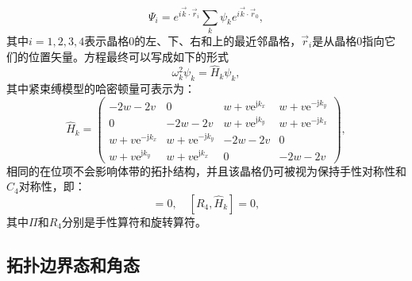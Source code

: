 \begin{equation}\label{eq4-6}
    \Psi_i = e^{i\vec{k} \cdot \vec{r}_i} \sum_{k} \psi_k e^{i\vec{k} \cdot \vec{r}_0},
\end{equation}
其中$i = 1,2,3,4$表示晶格0的左、下、右和上的最近邻晶格，$\vec{r}_i$是从晶格0指向它们的位置矢量。方程最终可以写成如下的形式
\begin{equation}\label{eq4-7}
    \omega_k^2 \psi_k = \hat{H}_k \psi_k,
\end{equation}
其中紧束缚模型的哈密顿量可表示为：
\begin{equation}
\hat{H}_k = 
\begin{pmatrix}
-2w - 2v & 0 & w + v\mathrm{e}^{\mathrm{j}k_x} & w + v\mathrm{e}^{-\mathrm{j}k_y} \\
0 & -2w - 2v & w + v\mathrm{e}^{\mathrm{j}k_y} & w + v\mathrm{e}^{-\mathrm{j}k_x} \\
w + v\mathrm{e}^{-\mathrm{j}k_x} & w + v\mathrm{e}^{-\mathrm{j}k_y} & -2w - 2v & 0 \\
w + v\mathrm{e}^{\mathrm{j}k_y} & w + v\mathrm{e}^{\mathrm{j}k_x} & 0 & -2w - 2v
\end{pmatrix},
\label{eq4-8}
\end{equation}
相同的在位项不会影响体带的拓扑结构，并且该晶格仍可被视为保持手性对称性和\(C_4\)对称性，即：
\begin{equation}
[\Pi, \hat{H}_k + (2w + 2v)\mathbb{I}_{4\times4}] = 0, \quad [R_4, \hat{H}_k] = 0,
\label{eq4-9}
\end{equation}
其中\(\Pi\)和\(R_4\)分别是手性算符和旋转算符。

\subsection{拓扑边界态和角态}

